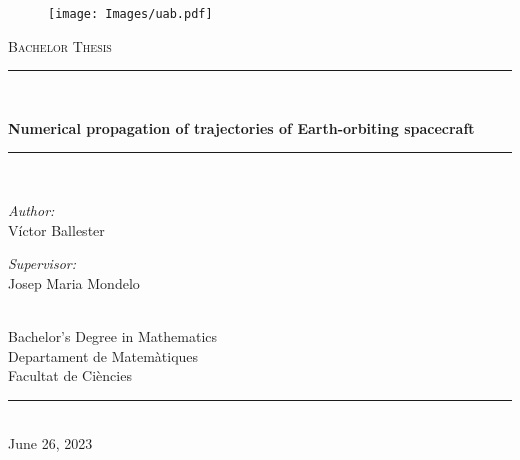 \documentclass{article}
\renewcommand\title{Numerical propagation of trajectories of Earth-orbiting spacecraft}
\renewcommand\author{Víctor Ballester}
\renewcommand\date{June 26, 2023}
\newcommand\supervisor{Josep Maria Mondelo}
\newcommand\faculty{Facultat de Ciències}
\newcommand\department{Departament de Matemàtiques}
\newcommand\degree{Bachelor's Degree in Mathematics}
\begin{document}
\begin{titlepage}
  \begin{center}
    \vspace*{1in}
    \begin{figure}[H]
      \begin{center}
        \texttt{[image: Images/uab.pdf]}
      \end{center}
    \end{figure}
    \vspace*{1.5cm}
    \textsc{\Large Bachelor Thesis}\\[0.75cm]
    \rule{150mm}{0.1mm}\\[0.4cm]
    {\huge \bfseries \title\par}
    \vspace{0.4cm} %
    \rule{150mm}{0.1mm} \\[1.5cm] %
    \begin{minipage}[ht]{0.4\textwidth}
      \begin{flushleft} \large
        \emph{Author:}\\[0.2cm]
        \author %
      \end{flushleft}
    \end{minipage}
    \begin{minipage}[ht]{0.4\textwidth}
      \begin{flushright} \large
        \emph{Supervisor:} \\[0.2cm]
        \supervisor %
      \end{flushright}
    \end{minipage}\\[3cm]
    \vfill
    {\large
      \degree\\[0.2cm]
      \department\\[0.2cm]
      \faculty\\[0.5cm]
    }
    \rule{80mm}{0.1mm}\\[0.5cm]
    {\large \date}\\[0.2cm]
    \vfill
  \end{center}
  \newpage
\end{titlepage}
\thispagestyle{empty}
\newpage
\thispagestyle{empty} %
\mbox{} %
\newpage %
\setcounter{page}{1}
\thispagestyle{empty}
\vspace*{\fill}
\end{document}
